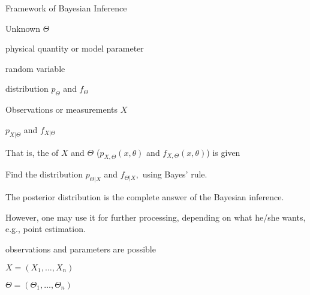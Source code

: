 
\begin{frame}{Framework of Bayesian Inference}

\begin{center}
\end{center}

\vspace{-0.4cm}
{
\small
  \plitemsep 0.03in
\bci
\item<2-> Unknown $\Theta$

\bci
\item physical quantity or model parameter
\item random variable
\item {} distribution $p_{\Theta}$ and $f_{\Theta}$
\eci

\item<3-> Observations or measurements $X$

\bci
\item {} $p_{X|\Theta}$ and $f_{X|\Theta}$
\eci

\item<4-> That is, the  of $X$ and $\Theta$ ($p_{X,\Theta}(x,\theta)$ and $f_{X,\Theta}(x,\theta)$) is given
\item<5-> Find the  distribution $p_{\Theta|X}$ and
  $f_{\Theta|X},$ using Bayes' rule.

  \eci
}
{
\small
  \plitemsep 0.08in
\bci

\item<5-> The posterior distribution is the complete answer of the
  Bayesian inference.

\item<6-> However, one may use it for further processing,
  depending on what he/she wants, e.g., point estimation. 
  
\item<7->  observations and  parameters are possible
  \bci
\item   $X = (X_1, \ldots, X_n)$
  \item $\Theta = (\Theta_1, \ldots, \Theta_n)$
  \eci

  \eci
}
\end{frame}







